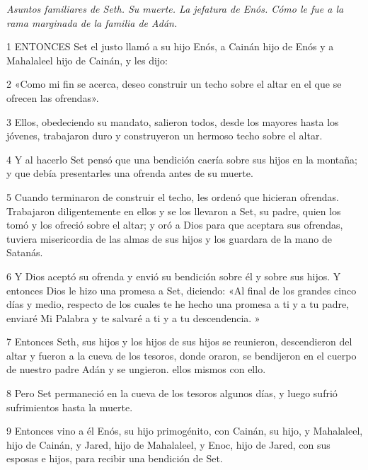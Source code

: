 \par \textit{Asuntos familiares de Seth. Su muerte. La jefatura de Enós. Cómo le fue a la rama marginada de la familia de Adán.}

\par 1 ENTONCES Set el justo llamó a su hijo Enós, a Cainán hijo de Enós y a Mahalaleel hijo de Cainán, y les dijo:

\par 2 «Como mi fin se acerca, deseo construir un techo sobre el altar en el que se ofrecen las ofrendas».

\par 3 Ellos, obedeciendo su mandato, salieron todos, desde los mayores hasta los jóvenes, trabajaron duro y construyeron un hermoso techo sobre el altar.

\par 4 Y al hacerlo Set pensó que una bendición caería sobre sus hijos en la montaña; y que debía presentarles una ofrenda antes de su muerte.

\par 5 Cuando terminaron de construir el techo, les ordenó que hicieran ofrendas. Trabajaron diligentemente en ellos y se los llevaron a Set, su padre, quien los tomó y los ofreció sobre el altar; y oró a Dios para que aceptara sus ofrendas, tuviera misericordia de las almas de sus hijos y los guardara de la mano de Satanás.

\par 6 Y Dios aceptó su ofrenda y envió su bendición sobre él y sobre sus hijos. Y entonces Dios le hizo una promesa a Set, diciendo: «Al final de los grandes cinco días y medio, respecto de los cuales te he hecho una promesa a ti y a tu padre, enviaré Mi Palabra y te salvaré a ti y a tu descendencia. »

\par 7 Entonces Seth, sus hijos y los hijos de sus hijos se reunieron, descendieron del altar y fueron a la cueva de los tesoros, donde oraron, se bendijeron en el cuerpo de nuestro padre Adán y se ungieron. ellos mismos con ello.

\par 8 Pero Set permaneció en la cueva de los tesoros algunos días, y luego sufrió sufrimientos hasta la muerte.

\par 9 Entonces vino a él Enós, su hijo primogénito, con Cainán, su hijo, y Mahalaleel, hijo de Cainán, y Jared, hijo de Mahalaleel, y Enoc, hijo de Jared, con sus esposas e hijos, para recibir una bendición de Set.

